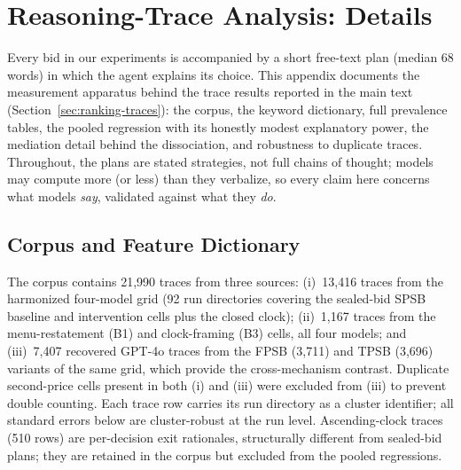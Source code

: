 %
\section{Reasoning-Trace Analysis: Details}\label{app:traces}

Every bid in our experiments is accompanied by a short free-text plan (median 68 words) in which the agent explains its choice. This appendix documents the measurement apparatus behind the trace results reported in the main text (Section~\ref{sec:ranking-traces}): the corpus, the keyword dictionary, full prevalence tables, the pooled regression with its honestly modest explanatory power, the mediation detail behind the dissociation, and robustness to duplicate traces. Throughout, the plans are stated strategies, not full chains of thought; models may compute more (or less) than they verbalize, so every claim here concerns what models \emph{say}, validated against what they \emph{do}.

\subsection{Corpus and Feature Dictionary}\label{app:traces-dictionary}

The corpus contains 21{,}990 traces from three sources: (i)~13{,}416 traces from the harmonized four-model grid (92 run directories covering the sealed-bid SPSB baseline and intervention cells plus the closed clock); (ii)~1{,}167 traces from the menu-restatement (B1) and clock-framing (B3) cells, all four models; and (iii)~7{,}407 recovered GPT-4o traces from the FPSB (3{,}711) and TPSB (3{,}696) variants of the same grid, which provide the cross-mechanism contrast. Duplicate second-price cells present in both (i) and (iii) were excluded from (iii) to prevent double counting. Each trace row carries its run directory as a cluster identifier; all standard errors below are cluster-robust at the run level. Ascending-clock traces (510 rows) are per-decision exit rationales, structurally different from sealed-bid plans; they are retained in the corpus but excluded from the pooled regressions.


